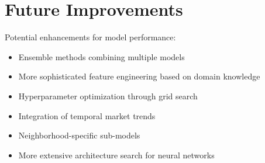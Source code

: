 \section{Future Improvements}
Potential enhancements for model performance:
\begin{itemize}
    \item Ensemble methods combining multiple models
    \item More sophisticated feature engineering based on domain knowledge
    \item Hyperparameter optimization through grid search 
    \item Integration of temporal market trends
    \item Neighborhood-specific sub-models
    \item More extensive architecture search for neural networks
\end{itemize} 